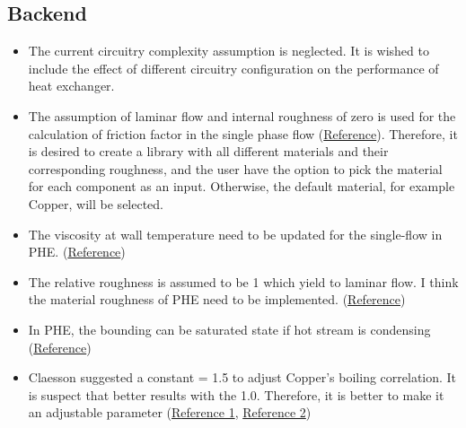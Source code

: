 \documentclass[]{article}
\begin{document}
\subsection{Backend}
\begin{itemize}
\item The current circuitry complexity assumption is neglected. It is wished to include the effect of different circuitry configuration on the performance of heat exchanger.
\item The assumption of laminar flow and internal roughness of zero is used for the calculation of friction factor in the single phase flow (\href{https://github.com/bo3mrh/ACHP-1/blob/master/ACHP/Correlations.py#L477}{Reference}). Therefore, it is desired to create a library with all different materials and their corresponding roughness, and the user have the option to pick the material for each component as an input. Otherwise, the default material, for example Copper, will be selected.
\item The viscosity at wall temperature need to be updated for the single-flow in PHE. (\href{https://github.com/OpenThermo/ACHP/blob/master/ACHP/Correlations.py#L570}{Reference})
\item The relative roughness is assumed to be 1 which yield to laminar flow. I think the material roughness of PHE need to be implemented. (\href{https://github.com/OpenThermo/ACHP/blob/master/ACHP/PHEHX.py#L494}{Reference})
\item In PHE, the bounding can be saturated state if hot stream is condensing (\href{https://github.com/OpenThermo/ACHP/blob/master/ACHP/PHEHX.py#L618}{Reference})
\item Claesson suggested a constant = 1.5 to adjust Copper's boiling correlation. It is suspect that better results with the 1.0. Therefore, it is better to make it an adjustable parameter (\href{https://github.com/OpenThermo/ACHP/blob/master/ACHP/PHEHX.py#L494}{Reference 1}, \href{https://github.com/OpenThermo/ACHP/blob/master/ACHP/Correlations.py#L623}{Reference 2})
\end{itemize}
\end{document}
